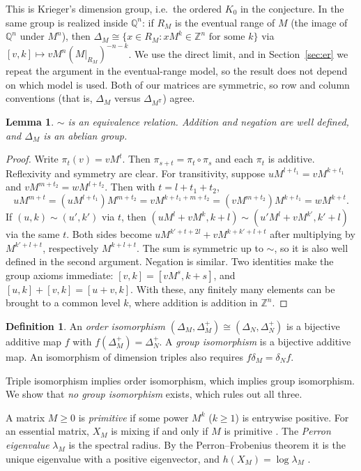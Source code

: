 \documentclass[11pt]{article}
\newtheorem{lemma}[theorem]{Lemma}
\theoremstyle{definition}
\newtheorem{definition}[theorem]{Definition}
\theoremstyle{remark}
\newcommand{\Z}{\mathbb{Z}}
\newcommand{\Q}{\mathbb{Q}}
\begin{document}
This is Krieger's dimension group, i.e.\ the ordered $K_0$ in the conjecture. In
\cite[\S7.5]{lm} the same group is realized inside $\Q^n$: if $R_M$ is the eventual
range of $M$ (the image of $\Q^n$ under $M^n$), then
$\Delta_M\cong\{x\in R_M: xM^k\in\Z^n\text{ for some }k\}$ via
$[v,k]\mapsto vM^n(M|_{R_M})^{-n-k}$. We use the direct limit, and in
Section~\ref{sec:er} we repeat the argument in the eventual-range model, so the
result does not depend on which model is used. Both of our matrices are symmetric,
so row and column conventions (that is, $\Delta_M$ versus $\Delta_{M^{\mathsf T}}$)
agree.

\begin{lemma}\label{lem:group}
$\sim$ is an equivalence relation. Addition and negation are well defined, and
$\Delta_M$ is an abelian group.
\end{lemma}
\begin{proof}
Write $\pi_t(v)=vM^t$. Then $\pi_{s+t}=\pi_t\circ\pi_s$ and each $\pi_t$ is
additive. Reflexivity and symmetry are clear. For transitivity, suppose
$uM^{l+t_1}=vM^{k+t_1}$ and $vM^{m+t_2}=wM^{l+t_2}$. Then with $t=l+t_1+t_2$,
\[
uM^{m+t}=(uM^{l+t_1})M^{m+t_2}=vM^{k+t_1+m+t_2}=(vM^{m+t_2})M^{k+t_1}=wM^{k+t}.
\]
If $(u,k)\sim(u',k')$ via $t$, then $(uM^l+vM^k,k+l)\sim(u'M^l+vM^{k'},k'+l)$
via the same $t$. Both sides become $uM^{k'+t+2l}+vM^{k+k'+l+t}$ after
multiplying by $M^{k'+l+t}$, respectively $M^{k+l+t}$. The sum is symmetric up to
$\sim$, so it is also well defined in the second argument. Negation is similar. Two
identities make the group axioms immediate:
$[v,k]=[vM^s,k+s]$, and $[u,k]+[v,k]=[u+v,k]$. With these, any finitely many
elements can be brought to a common level $k$, where addition is addition in
$\Z^n$.
\end{proof}

\begin{definition}
An \emph{order isomorphism} $(\Delta_M,\Delta_M^+)\cong(\Delta_N,\Delta_N^+)$ is a
bijective additive map $f$ with $f(\Delta_M^+)=\Delta_N^+$. A \emph{group
isomorphism} is a bijective additive map. An isomorphism of dimension triples also
requires $f\delta_M=\delta_Nf$.
\end{definition}
Triple isomorphism implies order isomorphism, which implies group isomorphism. We
show that \emph{no group isomorphism} exists, which rules out all three.

A matrix $M\ge0$ is \emph{primitive} if some power $M^k$ ($k\ge1$) is entrywise
positive. For an essential matrix, $X_M$ is mixing if and only if $M$ is primitive
\cite[\S4.5]{lm}. The \emph{Perron eigenvalue} $\lambda_M$ is the spectral radius.
By the Perron--Frobenius theorem it is the unique eigenvalue with a positive
eigenvector, and $h(X_M)=\log\lambda_M$ \cite[\S4.2--4.4]{lm}.
\end{document}
